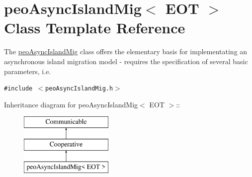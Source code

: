 \hypertarget{classpeoAsyncIslandMig}{
\section{peo\-Async\-Island\-Mig$<$ EOT $>$ Class Template Reference}
\label{classpeoAsyncIslandMig}
}
The \hyperlink{classpeoAsyncIslandMig}{peo\-Async\-Island\-Mig} class offers the elementary basis for implementating an asynchronous island migration model - requires the specification of several basic parameters, i.e.  


{\tt \#include $<$peo\-Async\-Island\-Mig.h$>$}

Inheritance diagram for peo\-Async\-Island\-Mig$<$ EOT $>$::\begin{figure}[H]
\begin{center}
\leavevmode
\includegraphics[height=3cm]{classpeoAsyncIslandMig}
\end{center}
\end{figure}
